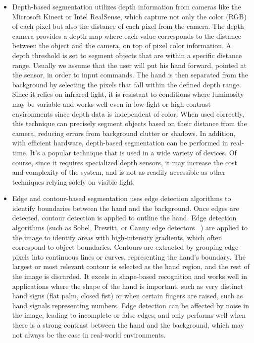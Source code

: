 \documentclass[12pt]{article}
\begin{document}
\begin{itemize}
  \item Depth-based segmentation utilizes depth information from cameras like the Microsoft Kinect or Intel RealSense, which capture not only the color (RGB) of each pixel but also the distance of each pixel from the camera. The depth camera provides a depth map where each value corresponds to the distance between the object and the camera, on top of pixel color information. A depth threshold is set to segment objects that are within a specific distance range. Usually we assume that the user will put his hand forward, pointed at the sensor, in order to input commands. The hand is then separated from the background by selecting the pixels that fall within the defined depth range. Since it relies on infrared light, it is resistant to conditions where luminosity may be variable and works well even in low-light or high-contrast environments since depth data is independent of color. When used correctly, this technique can precisely segment objects based on their distance from the camera, reducing errors from background clutter or shadows. In addition, with efficient hardware, depth-based segmentation can be performed in real-time. It's a popular technique that is used in a wide variety of devices.
    Of course, since it requires specialized depth sensors, it may increase the cost and complexity of the system, and is not as readily accessible as other techniques relying solely on visible light.
  \item Edge and contour-based segmentation uses edge detection algorithms to identify boundaries between the hand and the background. Once edges are detected, contour detection is applied to outline the hand. Edge detection algorithms (such as Sobel, Prewitt, or Canny edge detectors ~\cite{savant2014review}) are applied to the image to identify areas with high-intensity gradients, which often correspond to object boundaries. Contours are extracted by grouping edge pixels into continuous lines or curves, representing the hand’s boundary. The largest or most relevant contour is selected as the hand region, and the rest of the image is discarded. It excels in shape-based recognition and works well in applications where the shape of the hand is important, such as very distinct hand signs (flat palm, closed fist) or when certain fingers are raised, such as hand signals representing numbers. Edge detection can be affected by noise in the image, leading to incomplete or false edges, and only performs well when there is a strong contrast between the hand and the background, which may not always be the case in real-world environments.

\end{itemize}
\end{document}
